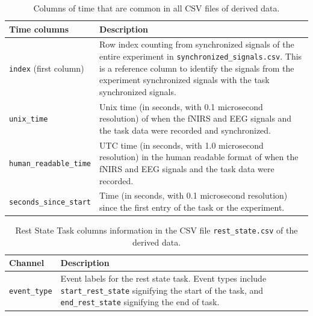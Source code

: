 \begin{table}[h]
\centering
\begin{tabularx}{\textwidth}{|l|X|}
\hline
\textbf{Time columns} & \textbf{Description} \\
\hline
\texttt{index} (first column) & Row index counting from synchronized signals of the entire experiment in \texttt{synchronized\_signals.csv}. This is a reference column to identify the signals from the experiment synchronized signals with the task synchronized signals.\\
\hline
\texttt{unix\_time} & Unix time (in seconds, with 0.1 microsecond resolution) of when the fNIRS and EEG signals and the task data were recorded and synchronized.\\
\hline
\texttt{human\_readable\_time} & UTC time (in seconds, with 1.0 microsecond resolution) in the human readable format of when the fNIRS and EEG signals and the task data were recorded.\\
\hline
\texttt{seconds\_since\_start} & Time (in seconds, with 0.1 microsecond resolution) since the first entry of the task or the experiment.\\
\hline
\end{tabularx}
\caption{Columns of time that are common in all CSV files of derived data.}
\label{tab:shared_columns}
\end{table}

\begin{table}[h]
\centering
\begin{tabularx}{\textwidth}{|l|X|}
\hline
\textbf{Channel} & \textbf{Description} \\
\hline
\texttt{event\_type} & Event labels for the rest state task. Event types include \texttt{start\_rest\_state} signifying the start of the task, and \texttt{end\_rest\_state} signifying the end of task.\\
\hline
\end{tabularx}
\caption{Rest State Task columns information in the CSV file \texttt{rest\_state.csv} of the derived data.}
\label{tab:rest_task_columns}
\end{table}

